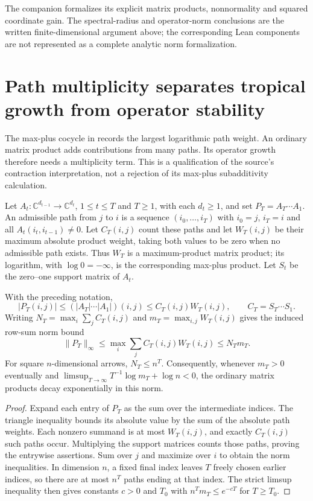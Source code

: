 The companion formalizes its explicit matrix products, nonnormality and
squared coordinate gain. The spectral-radius and operator-norm conclusions
are the written finite-dimensional argument above; the corresponding Lean
components are not represented as a complete analytic norm formalization.

\section{Path multiplicity separates tropical growth from operator stability}

The max-plus cocycle in \citet{ToricAuditQuivers2026} records the largest
logarithmic path weight. An ordinary matrix product adds contributions
from many paths. Its operator growth therefore needs a multiplicity term.
This is a qualification of the source's contraction interpretation, not
a rejection of its max-plus subadditivity calculation.

Let $A_t:\mathbb C^{d_{t-1}}\to\mathbb C^{d_t}$, $1\le t\le T$ and $T\ge1$, with
each $d_t\ge1$, and set $P_T=A_T\cdots A_1$. An admissible path from $j$
to $i$ is a sequence $(i_0,\ldots,i_T)$ with $i_0=j$, $i_T=i$ and
all $A_t(i_t,i_{t-1})\ne0$. Let $C_T(i,j)$ count these paths and let
$W_T(i,j)$ be their maximum absolute product weight, taking both values
to be zero when no admissible path exists. Thus $W_T$ is a maximum-product
matrix product; its logarithm, with $\log0=-\infty$, is the corresponding
max-plus product. Let $S_t$ be the zero--one support matrix of $A_t$.

\begin{theorem}
\label{thm:tropical-path-multiplicity}
With the preceding notation,
\[
 |P_T(i,j)|\le (|A_T|\cdots|A_1|)(i,j)
 \le C_T(i,j)W_T(i,j),
 \qquad C_T=S_T\cdots S_1.
\]
Writing $N_T=\max_i\sum_jC_T(i,j)$ and
$m_T=\max_{i,j}W_T(i,j)$ gives the induced row-sum norm bound
\[
 \|P_T\|_\infty
 \le\max_i\sum_j C_T(i,j)W_T(i,j)
 \le N_Tm_T.
\]
For square $n$-dimensional arrows, $N_T\le n^T$. Consequently, whenever
$m_T>0$ eventually and
$\limsup_{T\to\infty}T^{-1}\log m_T+\log n<0$, the ordinary matrix
products decay exponentially in this norm.
\end{theorem}
\begin{proof}
Expand each entry of $P_T$ as the sum over the intermediate indices.
The triangle inequality bounds its absolute value by the sum of the
absolute path weights. Each nonzero summand is at most $W_T(i,j)$,
and exactly $C_T(i,j)$ such paths occur. Multiplying the support matrices
counts those paths, proving the entrywise assertions. Sum over $j$ and
maximize over $i$ to obtain the norm inequalities. In dimension $n$, a
fixed final index leaves $T$ freely chosen earlier indices, so there
are at most $n^T$ paths ending at that index. The strict limsup inequality
then gives constants $c>0$ and $T_0$ with
$n^Tm_T\le e^{-cT}$ for $T\ge T_0$.
\end{proof}

